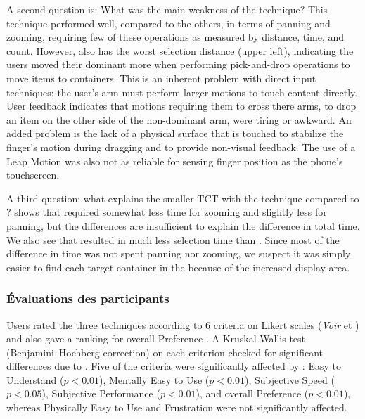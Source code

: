 
A second question is: What was the main weakness of the  technique? This technique performed well, compared to the others, in terms of panning and zooming, requiring few of these operations as measured by distance, time, and count. However,  also has the worst selection distance  (upper left), indicating the users moved their dominant more when performing pick-and-drop operations to move items to containers. This is an inherent problem with direct input techniques: the user's arm must perform larger motions to touch content directly. User feedback indicates that motions requiring them to cross there arms, to drop an item on the other side of the non-dominant arm, were tiring or awkward. An added problem is the lack of a physical surface that is touched to stabilize the finger's motion during dragging and to provide non-visual feedback. The use of a Leap Motion was also not as reliable for sensing finger position as the phone's touchscreen.

A third question: what explains the smaller TCT with the  technique compared to ?  shows that  required somewhat less time for zooming and slightly less for panning, but the differences are insufficient to explain the difference in total time. We also see that  resulted in much less selection time than . Since most of the difference in time was not spent panning nor zooming, we suspect it was simply easier to find each target container in the  because of the increased display area.

\subsubsection{Évaluations des participants}
\label{subsubsec:experiment_results_evaluations}

Users rated the three techniques according to 6 criteria on Likert scales (\textit{Voir}  et ) and also gave a ranking for overall Preference . A Kruskal-Wallis test (Benjamini–Hochberg correction) on each criterion checked for significant differences due to . Five of the criteria were significantly affected by : Easy to Understand ($p<0.01$), Mentally Easy to Use ($p<0.01$), Subjective Speed ($p<0.05$), Subjective Performance ($p<0.01$), and overall Preference ($p<0.01$), whereas Physically Easy to Use and Frustration were not significantly affected.

